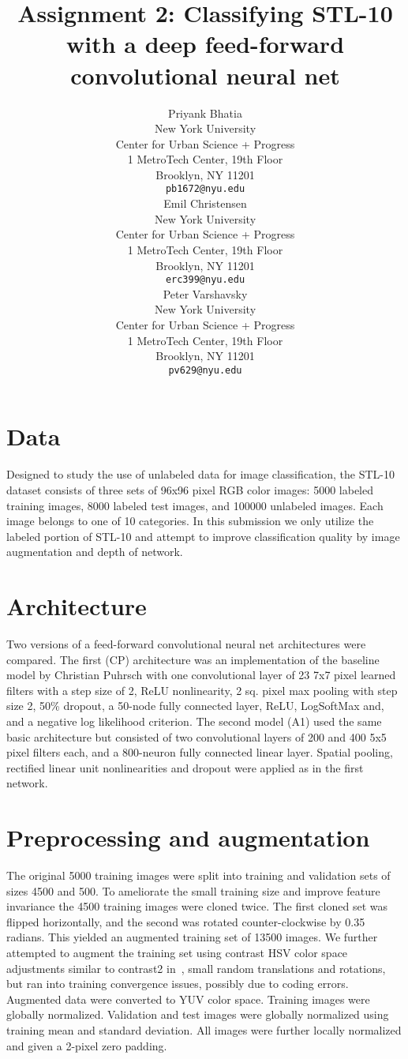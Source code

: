 \documentclass{article} %
\title{Assignment 2: Classifying STL-10 with a deep feed-forward convolutional neural net}
\author{
Priyank Bhatia \\
New York University \\
Center for Urban Science + Progress \\
1 MetroTech Center, 19th Floor \\
Brooklyn, NY 11201 \\
\texttt{pb1672@nyu.edu} \\
\AND
Emil Christensen \\
New York University \\
Center for Urban Science + Progress \\
1 MetroTech Center, 19th Floor \\
Brooklyn, NY 11201 \\
\texttt{erc399@nyu.edu} \\
\And
Peter Varshavsky \\
New York University \\
Center for Urban Science + Progress \\
1 MetroTech Center, 19th Floor \\
Brooklyn, NY 11201 \\
\texttt{pv629@nyu.edu} \\
}
\begin{document}
\maketitle



\section{Data}
\label{data}
Designed to study the use of unlabeled data for image classification, the STL-10 dataset \cite{coates2011analysis} consists of three sets of 96x96 pixel RGB color images: 5000 labeled training images, 8000 labeled test images, and 100000 unlabeled images. Each image belongs to one of 10 categories. In this submission we only utilize the labeled portion of STL-10 and attempt to improve classification quality by image augmentation and depth of network.

\section{Architecture}
\label{arc}
Two versions of a feed-forward convolutional neural net architectures were compared. The first (CP) architecture was an implementation of the baseline model by Christian Puhrsch with one convolutional layer of 23 7x7 pixel learned filters with a step size of 2, ReLU nonlinearity, 2 sq. pixel max pooling with step size 2, 50\% dropout, a 50-node fully connected layer, ReLU, LogSoftMax and, and a negative log likelihood criterion.
The second model (A1) used the same basic architecture but consisted of two convolutional layers of 200 and 400 5x5 pixel filters each, and a 800-neuron fully connected linear layer. Spatial pooling, rectified linear unit nonlinearities and dropout were applied as in the first network.

\section{Preprocessing and augmentation}
\label{preproc}
The original 5000 training images were split into training and validation sets of sizes 4500 and 500. To ameliorate the small training size and improve feature invariance the 4500 training images were cloned twice. The first cloned set was flipped horizontally, and the second was rotated counter-clockwise by 0.35 radians. This yielded an augmented training set of 13500 images. We further attempted to augment the training set using contrast HSV color space adjustments similar to contrast2 in~\cite{DosovitskiySRB14}, small random translations and rotations, but ran into training convergence issues, possibly due to coding errors. Augmented data were converted to YUV color space. Training images were globally normalized. Validation and test images were globally normalized using training mean and standard deviation. All images were further locally normalized and given a 2-pixel zero padding.
\end{document}

